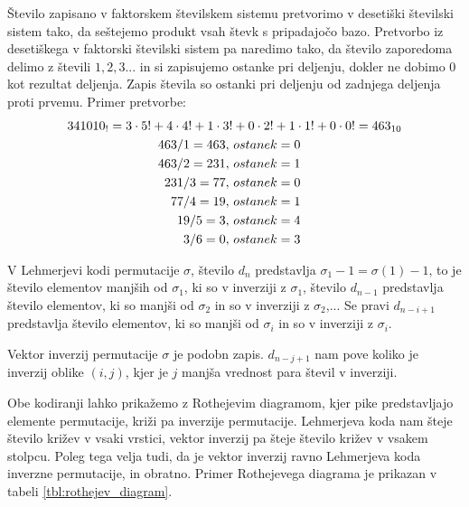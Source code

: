 \documentclass[a4paper, 12pt]{book}
\begin{document}
Število zapisano v faktorskem številskem sistemu pretvorimo v desetiški številski sistem tako, da seštejemo produkt vsah števk s pripadajočo bazo. Pretvorbo iz desetiškega v faktorski številski sistem pa naredimo tako, da število zaporedoma delimo z števili $1, 2, 3...$ in si zapisujemo ostanke pri deljenju, dokler ne dobimo 0 kot rezultat deljenja. Zapis števila so ostanki pri deljenju od zadnjega deljenja proti prvemu. Primer pretvorbe: 
\begin{align}
    341010_{!} = 3 \cdot 5! + 4 \cdot 4! + 1 \cdot 3&! + 0 \cdot 2! + 1 \cdot 1! + 0 \cdot 0! = 463_{10} \notag\\
    463 / 1 = 463,&\ ostanek = 0 \notag\\
    463 / 2 = 231,&\ ostanek = 1 \notag\\
    231 / 3 = 77,&\ ostanek = 0 \notag\\
    77 / 4 = 19,&\ ostanek = 1 \notag\\
    19 / 5 = 3,&\ ostanek = 4 \notag\\
    3 / 6 = 0,&\ ostanek = 3 \notag
\end{align}

V Lehmerjevi kodi permutacije $\sigma$, število $d_n$ predstavlja $\sigma_1 - 1 = \sigma(1) - 1$, to je število elementov manjših od $\sigma_1$, ki so v inverziji z $\sigma_1$, število $d_{n-1}$ predstavlja število elementov, ki so manjši od $\sigma_2$ in so v inverziji z $\sigma_2$,... Se pravi $d_{n-i+1}$ predstavlja število elementov, ki so manjši od $\sigma_i$ in so v inverziji z $\sigma_i$.

Vektor inverzij permutacije $\sigma$ je podobn zapis. $d_{n-j+1}$ nam pove koliko je inverzij oblike $(i, j)$, kjer je $j$ manjša vrednost para števil v inverziji.

Obe kodiranji lahko prikažemo z Rothejevim diagramom, kjer pike predstavljajo elemente permutacije, križi pa inverzije permutacije. Lehmerjeva koda nam šteje število križev v vsaki vrstici, vektor inverzij pa šteje število križev v vsakem stolpcu. Poleg tega velja tudi, da je vektor inverzij ravno Lehmerjeva koda inverzne permutacije, in obratno. Primer Rothejevega diagrama je prikazan v tabeli \ref{tbl:rothejev_diagram}.
\end{document}

